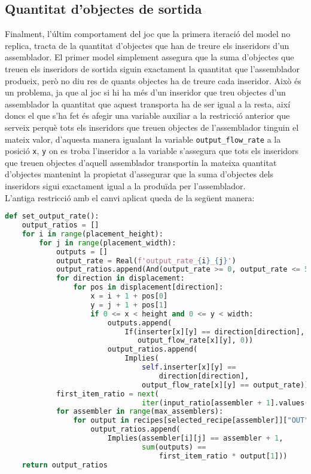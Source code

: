 \subsection{Quantitat d’objectes de sortida}
Finalment, l'últim comportament del joc que la primera iteració del model no replica, tracta de la quantitat d'objectes que han de treure els inseridors d'un assemblador. El primer model simplement assegura que la suma d'objectes que treuen els inseridors de sortida siguin exactament la quantitat que l'assemblador produeix, però no diu res de quants objectes ha de treure cada inseridor. Això és un problema, ja que al joc si hi ha més d'un inseridor que treu objectes d'un assemblador la quantitat que aquest transporta ha de ser igual a la resta, així doncs el que s'ha fet és afegir una variable auxiliar a la restricció anterior que serveix perquè tots els inseridors que treuen objectes de l'assemblador tinguin el mateix valor, d'aquesta manera igualant la variable \lstinline{output_flow_rate} a la posició \lstinline{x}, \lstinline{y} on es troba l'inseridor a la variable s'assegura que tots els inseridors que treuen objectes d'aquell assemblador transportin la mateixa quantitat d'objectes mantenint la propietat d'assegurar que la suma d'objectes dels inseridors sigui exactament igual a la produïda per l'assemblador.\\

L'antiga restricció amb el canvi aplicat queda de la següent manera:

\begin{lstlisting}[language=Python, caption=Output Rate]
def set_output_rate():
    output_ratios = []
    for i in range(placement_height):
        for j in range(placement_width):
            outputs = []
            output_rate = Real(f'output_rate_{i}_{j}')
            output_ratios.append(And(output_rate >= 0, output_rate <= 50))
            for direction in displacement:
                for pos in displacement[direction]:
                    x = i + 1 + pos[0]
                    y = j + 1 + pos[1]
                    if 0 <= x < height and 0 <= y < width:
                        outputs.append(
                            If(inserter[x][y] == direction[direction],
                               output_flow_rate[x][y], 0))
                        output_ratios.append(
                            Implies(
                                self.inserter[x][y] ==
                                    direction[direction],
                                output_flow_rate[x][y] == output_rate))
            first_item_ratio = next(
                                iter(input_ratio[assembler + 1].values()))
            for assembler in range(max_assemblers):
                for output in recipes[selected_recipe[assembler]]["OUT"]:
                    output_ratios.append(
                        Implies(assembler[i][j] == assembler + 1,
                                sum(outputs) == 
                                    first_item_ratio * output[1]))
    return output_ratios
\end{lstlisting}

